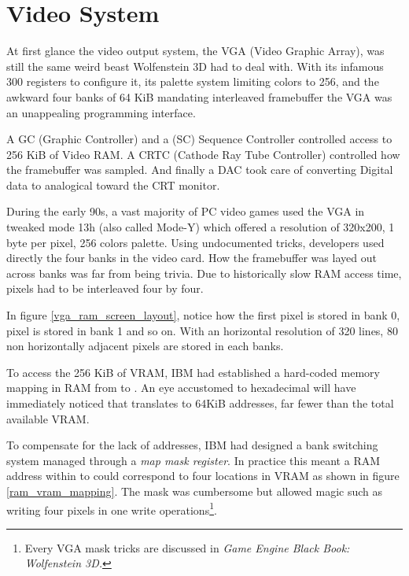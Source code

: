 \section{Video System}
At first glance the video output system, the VGA (Video Graphic Array), was still the same weird beast Wolfenstein 3D had to deal with. With its infamous 300 registers to configure it, its palette system limiting colors to 256, and the awkward four banks of 64 KiB mandating interleaved framebuffer the VGA was an unappealing programming interface.\\
\par
A GC (Graphic Controller) and a (SC) Sequence Controller controlled access to 256 KiB of Video RAM. A CRTC (Cathode Ray Tube Controller) controlled how the framebuffer was sampled. And finally a DAC took care of converting Digital data to analogical toward the CRT monitor.\\
\par 	
{}
\par
During the early 90s, a vast majority of PC video games used the VGA in tweaked mode 13h (also called Mode-Y) which offered a resolution of 320x200, 1 byte per pixel, 256 colors palette. Using undocumented tricks, developers used directly the four banks in the video card. How the framebuffer was layed out across banks was far from being trivia. Due to historically slow RAM access time, pixels had to be interleaved four by four.




\par
In figure \ref{vga_ram_screen_layout}, notice how the first pixel  is stored in bank 0, pixel  is stored in bank 1 and so on. With an horizontal resolution of 320 lines, 80 non horizontally adjacent pixels are stored in each banks.\\
\par
To access the 256 KiB of VRAM, IBM had established a hard-coded memory mapping in RAM from  to . An eye accustomed to hexadecimal will have immediately noticed that  translates to 64KiB addresses, far fewer than the total available VRAM.\\
\par
 To compensate for the lack of addresses, IBM had designed a bank switching system managed through a \textit{map mask register}. In practice this meant a RAM address within  to  could correspond to four locations in VRAM as shown in figure \ref{ram_vram_mapping}. The mask was cumbersome but allowed magic such as writing four pixels in one write operations\footnote{Every VGA mask tricks are discussed in \it{Game Engine Black Book: Wolfenstein 3D}.}.



